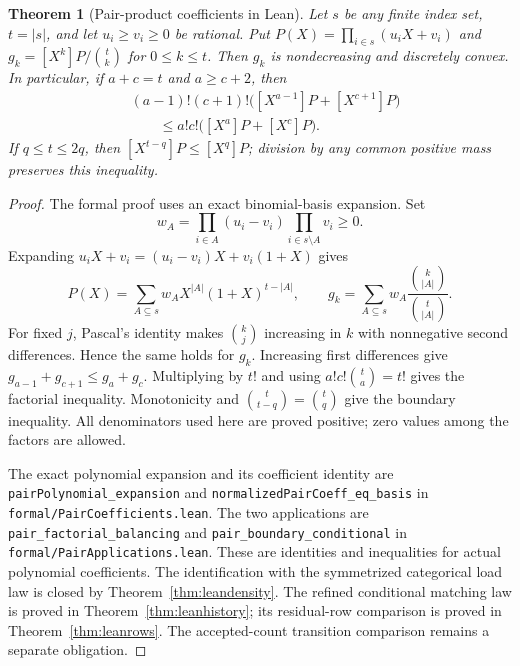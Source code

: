 \documentclass[11pt]{article}
\newtheorem{theorem}{Theorem}
\begin{document}
\begin{theorem}[Pair-product coefficients in Lean]\label{thm:leanpair}
Let $s$ be any finite index set, $t=|s|$, and let $u_i\geq v_i\geq0$
be rational. Put $P(X)=\prod_{i\in s}(u_iX+v_i)$ and
$g_k=[X^k]P/\binom tk$ for $0\leq k\leq t$.
Then $g_k$ is nondecreasing and discretely convex. In particular,
if $a+c=t$ and $a\geq c+2$, then
\begin{align*}
 &(a-1)!(c+1)!\bigl([X^{a-1}]P+[X^{c+1}]P\bigr)\\
 &\hspace{2em}\leq a!c!\bigl([X^a]P+[X^c]P\bigr).
\end{align*}
If $q\leq t\leq2q$, then $[X^{t-q}]P\leq[X^q]P$; division by any
common positive mass preserves this inequality.
\end{theorem}
\begin{proof}
The formal proof uses an exact binomial-basis expansion. Set
\[
 w_A=\prod_{i\in A}(u_i-v_i)\prod_{i\in s\setminus A}v_i\geq0.
\]
Expanding $u_iX+v_i=(u_i-v_i)X+v_i(1+X)$ gives
\[
 P(X)=\sum_{A\subseteq s}w_A X^{|A|}(1+X)^{t-|A|},\qquad
 g_k=\sum_{A\subseteq s}w_A\frac{\binom{k}{|A|}}{\binom{t}{|A|}}.
\]
For fixed $j$, Pascal's identity makes $\binom{k}{j}$ increasing in
$k$ with nonnegative second differences. Hence the same holds for
$g_k$. Increasing first differences give
$g_{a-1}+g_{c+1}\leq g_a+g_c$. Multiplying by $t!$ and using
$a!c!\binom ta=t!$ gives the factorial inequality. Monotonicity and
$\binom t{t-q}=\binom tq$ give the boundary inequality. All denominators
used here are proved positive; zero values among the factors are allowed.

The exact polynomial expansion and its coefficient identity are
\texttt{pairPolynomial\_expansion} and
\texttt{normalizedPairCoeff\_eq\_basis} in
\texttt{formal/PairCoefficients.lean}. The two applications are
\texttt{pair\_factorial\_balancing} and
\texttt{pair\_boundary\_conditional} in
\texttt{formal/PairApplications.lean}.
These are identities and inequalities for actual polynomial coefficients.
The identification with the symmetrized categorical load law is closed
by Theorem~\ref{thm:leandensity}. The refined conditional matching law
is proved in Theorem~\ref{thm:leanhistory}; its residual-row comparison
is proved in Theorem~\ref{thm:leanrows}. The accepted-count transition
comparison remains a separate obligation.
\end{proof}
\end{document}
